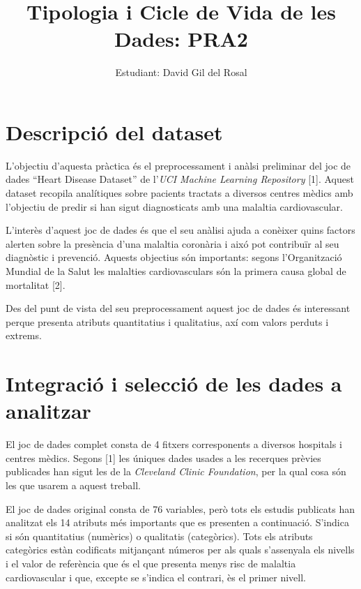\documentclass[12,]{article}
\title{Tipologia i Cicle de Vida de les Dades: PRA2}
\author{Estudiant: David Gil del Rosal}
\date{}
\begin{document}
\maketitle

\hypertarget{descripcio-del-dataset}{%
\section{Descripció del dataset}\label{descripcio-del-dataset}}

L'objectiu d'aquesta pràctica és el preprocessament i anàlsi preliminar
del joc de dades ``Heart Disease Dataset'' de l'\emph{UCI Machine
Learning Repository} {[}1{]}. Aquest dataset recopila analítiques sobre
pacients tractats a diversos centres mèdics amb l'objectiu de predir si
han sigut diagnosticats amb una malaltia cardiovascular.

L'interès d'aquest joc de dades és que el seu anàlisi ajuda a conèixer
quins factors alerten sobre la presència d'una malaltia coronària i aixó
pot contribuïr al seu diagnòstic i prevenció. Aquests objectius són
importants: segons l'Organització Mundial de la Salut les malalties
cardiovasculars són la primera causa global de mortalitat {[}2{]}.

Des del punt de vista del seu preprocessament aquest joc de dades és
interessant perque presenta atributs quantitatius i qualitatius, axí com
valors perduts i extrems.

\hypertarget{integracio-i-seleccio-de-les-dades-a-analitzar}{%
\section{Integració i selecció de les dades a
analitzar}\label{integracio-i-seleccio-de-les-dades-a-analitzar}}

El joc de dades complet consta de 4 fitxers corresponents a diversos
hospitals i centres mèdics. Segons {[}1{]} les úniques dades usades a
les recerques prèvies publicades han sigut les de la \emph{Cleveland
Clinic Foundation}, per la qual cosa són les que usarem a aquest
treball.

El joc de dades original consta de 76 variables, però tots els estudis
publicats han analitzat els 14 atributs més importants que es presenten
a continuació. S'indica si són quantitatius (numèrics) o qualitatis
(categòrics). Tots els atributs categòrics estàn codificats mitjançant
números per als quals s'assenyala els nivells i el valor de referència
que és el que presenta menys risc de malaltia cardiovascular i que,
excepte se s'indica el contrari, ès el primer nivell.
\end{document}
